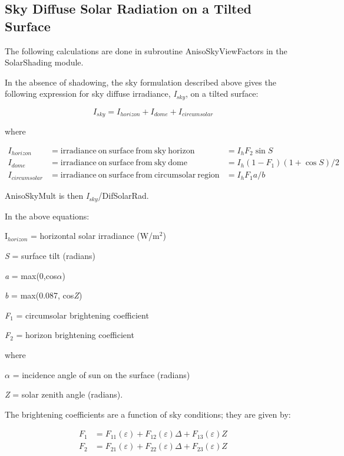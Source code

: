 \subsection{Sky Diffuse Solar Radiation on a Tilted Surface}\label{sky-diffuse-solar-radiation-on-a-tilted-surface}

The following calculations are done in subroutine AnisoSkyViewFactors in the SolarShading module.

In the absence of shadowing, the sky formulation described above gives the following expression for sky diffuse irradiance, \emph{I\(_{sky}\)}, on a tilted surface:

\begin{equation}
{I_{sky}} = {I_{horizon}} + {I_{dome}} + {I_{circumsolar}}
\end{equation}

where

\begin{equation}
\begin{array}{rcl}
    I_{horizon} & = \mathrm{irradiance~on~surface~from~sky~horizon} & = I_h F_2\sin S \\
    I_{dome}    & = \mathrm{irradiance~on~surface~from~sky~dome}    & = I_h (1 - F_1)(1 + \cos S)/2 \\
    I_{circumsolar} & = \mathrm{irradiance~on~surface~from~circumsolar~region} & = I_h F_1 a/b
\end{array}
\end{equation}

AnisoSkyMult is then \emph{I\(_{sky}\)}/DifSolarRad.

In the above equations:

I\(_{horizon}\) = horizontal solar irradiance (W/m\(^{2}\))

\emph{S} = surface tilt (radians)

\emph{a} = max(0,cos\emph{$\alpha$})

\emph{b} = max(0.087, cos\emph{Z})

\emph{F\(_{1}\)} = circumsolar brightening coefficient

\emph{F\(_{2}\)} = horizon brightening coefficient

where

\emph{$\alpha$} = incidence angle of sun on the surface (radians)

\emph{Z} = solar zenith angle (radians).

The brightening coefficients are a function of sky conditions; they are given by:

\begin{equation}
\begin{array}{rl}
    F_1 & = F_{11}(\varepsilon ) + F_{12}(\varepsilon )\Delta  + F_{13}(\varepsilon )Z  \\
    F_2 & = F_{21}(\varepsilon ) + F_{22}(\varepsilon )\Delta  + F_{23}(\varepsilon )Z
\end{array}
\end{equation}

